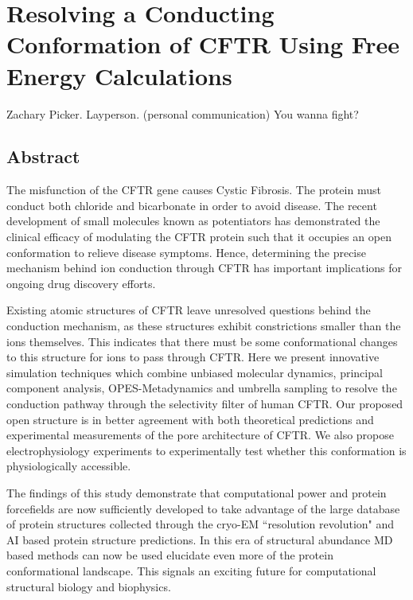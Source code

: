 \chapter{Resolving a Conducting Conformation of CFTR Using Free Energy Calculations}
\label{chap:opening}
\setcounter{figure}{0}
\renewcommand{\thefigure}{\arabic{chapter}.\arabic{figure}}
\begin{chapquote}{ Zachary Picker. Layperson. (personal communication)}
You wanna fight? 
\end{chapquote}


\section*{\centering Abstract} 
The misfunction of the CFTR gene causes Cystic Fibrosis. The protein must conduct both chloride and bicarbonate in order to avoid disease. The recent development of small molecules known as potentiators has demonstrated the clinical efficacy of modulating the CFTR protein such that it occupies an open conformation to relieve disease symptoms. Hence, determining the precise mechanism behind ion conduction through CFTR has important implications for ongoing drug discovery efforts.

Existing atomic structures of CFTR leave unresolved questions behind the conduction mechanism, as these structures exhibit constrictions smaller than the ions themselves. This indicates that there must be some conformational changes to this structure for ions to pass through CFTR. Here we present innovative simulation techniques which combine unbiased molecular dynamics, principal component analysis, OPES-Metadynamics and umbrella sampling to resolve the conduction pathway through the selectivity filter of human CFTR. Our proposed open structure is in better agreement with both theoretical predictions and experimental measurements of the pore architecture of CFTR. We also propose electrophysiology experiments to experimentally test whether this conformation is physiologically accessible.  

The findings of this study demonstrate that computational power and protein forcefields are now sufficiently developed to take advantage of the large database of protein structures collected through the cryo-EM ``resolution revolution" and AI based protein structure predictions. In this era of structural abundance MD based methods can now be used elucidate even more of the protein conformational landscape. This signals an exciting future for computational structural biology and biophysics.

